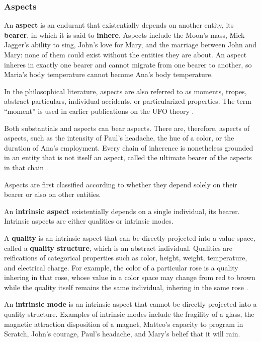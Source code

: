 \subsubsection{Aspects}

An \textbf{aspect} is an endurant that existentially depends on another entity, its \textbf{bearer}, in which it is said to \textbf{inhere}. Aspects include the Moon's mass, Mick Jagger's ability to sing, John's love for Mary, and the marriage between John and Mary: none of them could exist without the entities they are about. An aspect inheres in exactly one bearer and cannot migrate from one bearer to another, so Maria's body temperature cannot become Ana's body temperature.

In the philosophical literature, aspects are also referred to as moments, tropes, abstract particulars, individual accidents, or particularized properties. The term ``moment'' is used in earlier publications on the UFO theory \cite{ontological_foundations_for_structural_conceptual_models_2005,guizzardi2006tropes,ufo_unified_foundational_ontology_2021}.

Both substantials and aspects can bear aspects. There are, therefore, aspects of aspects, such as the intensity of Paul's headache, the hue of a color, or the duration of Ana's employment. Every chain of inherence is nonetheless grounded in an entity that is not itself an aspect, called the ultimate bearer of the aspects in that chain \cite{ontological_foundations_for_structural_conceptual_models_2005}.

Aspects are first classified according to whether they depend solely on their bearer or also on other entities.

An \textbf{intrinsic aspect} existentially depends on a single individual, its bearer. Intrinsic aspects are either qualities or intrinsic modes.

A \textbf{quality} is an intrinsic aspect that can be directly projected into a value space, called a \textbf{quality structure}, which is an abstract individual. Qualities are reifications of categorical properties such as color, height, weight, temperature, and electrical charge. For example, the color of a particular rose is a quality inhering in that rose, whose value in a color space may change from red to brown while the quality itself remains the same individual, inhering in the same rose \cite{guizzardi2006tropes}.

An \textbf{intrinsic mode} is an intrinsic aspect that cannot be directly projected into a quality structure. Examples of intrinsic modes include the fragility of a glass, the magnetic attraction disposition of a magnet, Matteo's capacity to program in Scratch, John's courage, Paul's headache, and Mary's belief that it will rain.

